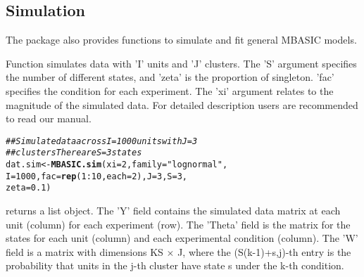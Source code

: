\documentclass[a4paper,10pt]{article}\usepackage[]{graphicx}\usepackage[]{color}
\makeatletter
\newcommand{\hlnum}[1]{\textcolor[rgb]{0.686,0.059,0.569}{#1}}%
\newcommand{\hlstr}[1]{\textcolor[rgb]{0.192,0.494,0.8}{#1}}%
\newcommand{\hlcom}[1]{\textcolor[rgb]{0.678,0.584,0.686}{\textit{#1}}}%
\newcommand{\hlopt}[1]{\textcolor[rgb]{0,0,0}{#1}}%
\newcommand{\hlstd}[1]{\textcolor[rgb]{0.345,0.345,0.345}{#1}}%
\newcommand{\hlkwb}[1]{\textcolor[rgb]{0.69,0.353,0.396}{#1}}%
\newcommand{\hlkwc}[1]{\textcolor[rgb]{0.333,0.667,0.333}{#1}}%
\newcommand{\hlkwd}[1]{\textcolor[rgb]{0.737,0.353,0.396}{\textbf{#1}}}%
\newenvironment{kframe}{%
 \def\at@end@of@kframe{}%
 \ifinner\ifhmode%
  \def\at@end@of@kframe{\end{minipage}}%
  \begin{minipage}{\columnwidth}%
 \fi\fi%
 \def\FrameCommand##1{\hskip\@totalleftmargin \hskip-\fboxsep
 \colorbox{shadecolor}{##1}\hskip-\fboxsep
     \hskip-\linewidth \hskip-\@totalleftmargin \hskip\columnwidth}%
 \MakeFramed {\advance\hsize-\width
   \@totalleftmargin\z@ \linewidth\hsize
   \@setminipage}}%
 {\par\unskip\endMakeFramed%
 \at@end@of@kframe}
\newenvironment{knitrout}{}{} %
\makeatother
\begin{document}
\subsection{Simulation}

The  package also provides functions to simulate and fit general MBASIC models.

Function  simulates data with 'I' units and 'J' clusters. The 'S' argument specifies the number of different states, and 'zeta' is the proportion of singleton. 'fac' specifies the condition for each experiment. The 'xi' argument relates to the magnitude of the simulated data. For detailed description users are recommended to read our manual.

\begin{knitrout}
\color{fgcolor}\begin{kframe}
\begin{alltt}
\hlcom{## Simulate data across I=1000 units with J=3}
\hlcom{## clusters There are S=3 states}
\hlstd{dat.sim} \hlkwb{<-} \hlkwd{MBASIC.sim}\hlstd{(}\hlkwc{xi} \hlstd{=} \hlnum{2}\hlstd{,} \hlkwc{family} \hlstd{=} \hlstr{"lognormal"}\hlstd{,}
    \hlkwc{I} \hlstd{=} \hlnum{1000}\hlstd{,} \hlkwc{fac} \hlstd{=} \hlkwd{rep}\hlstd{(}\hlnum{1}\hlopt{:}\hlnum{10}\hlstd{,} \hlkwc{each} \hlstd{=} \hlnum{2}\hlstd{),} \hlkwc{J} \hlstd{=} \hlnum{3}\hlstd{,} \hlkwc{S} \hlstd{=} \hlnum{3}\hlstd{,}
    \hlkwc{zeta} \hlstd{=} \hlnum{0.1}\hlstd{)}
\end{alltt}
\end{kframe}
\end{knitrout}

 returns a list object. The 'Y' field contains the simulated data matrix at each unit (column) for each experiment (row). The 'Theta' field is the matrix for the states for each unit (column) and each experimental condition (column). The 'W' field is a matrix with dimensions KS $\times$ J, where the (S(k-1)+s,j)-th entry is the probability that units in the j-th cluster have state s under the k-th condition.
\end{document}
